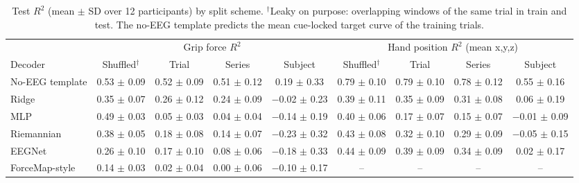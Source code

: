\begin{table}[t]
\centering
\caption{Test $R^2$ (mean $\pm$ SD over 12 participants) by split scheme. $^\dagger$Leaky on purpose: overlapping windows of the same trial in train and test. The no-EEG template predicts the mean cue-locked target curve of the training trials.}
\label{tab:e1}
\footnotesize
\setlength{\tabcolsep}{3pt}
\begin{tabular}{lcccccccc}
\toprule
& \multicolumn{4}{c}{Grip force $R^2$} & \multicolumn{4}{c}{Hand position $R^2$ (mean x,y,z)} \\
\cmidrule(lr){2-5}\cmidrule(lr){6-9}
Decoder & Shuffled$^\dagger$ & Trial & Series & Subject & Shuffled$^\dagger$ & Trial & Series & Subject \\
\midrule
No-EEG template & 0.53 $\pm$ 0.09 & 0.52 $\pm$ 0.09 & 0.51 $\pm$ 0.12 & 0.19 $\pm$ 0.33 & 0.79 $\pm$ 0.10 & 0.79 $\pm$ 0.10 & 0.78 $\pm$ 0.12 & 0.55 $\pm$ 0.16 \\
\midrule
Ridge & 0.35 $\pm$ 0.07 & 0.26 $\pm$ 0.12 & 0.24 $\pm$ 0.09 & $-$0.02 $\pm$ 0.23 & 0.39 $\pm$ 0.11 & 0.35 $\pm$ 0.09 & 0.31 $\pm$ 0.08 & 0.06 $\pm$ 0.19 \\
MLP & 0.49 $\pm$ 0.03 & 0.05 $\pm$ 0.03 & 0.04 $\pm$ 0.04 & $-$0.14 $\pm$ 0.19 & 0.40 $\pm$ 0.06 & 0.17 $\pm$ 0.07 & 0.15 $\pm$ 0.07 & $-$0.01 $\pm$ 0.09 \\
Riemannian & 0.38 $\pm$ 0.05 & 0.18 $\pm$ 0.08 & 0.14 $\pm$ 0.07 & $-$0.23 $\pm$ 0.32 & 0.43 $\pm$ 0.08 & 0.32 $\pm$ 0.10 & 0.29 $\pm$ 0.09 & $-$0.05 $\pm$ 0.15 \\
EEGNet & 0.26 $\pm$ 0.10 & 0.17 $\pm$ 0.10 & 0.08 $\pm$ 0.06 & $-$0.18 $\pm$ 0.33 & 0.44 $\pm$ 0.09 & 0.39 $\pm$ 0.09 & 0.34 $\pm$ 0.09 & 0.02 $\pm$ 0.17 \\
ForceMap-style & 0.14 $\pm$ 0.03 & 0.02 $\pm$ 0.04 & 0.00 $\pm$ 0.06 & $-$0.10 $\pm$ 0.17 & -- & -- & -- & -- \\
\bottomrule
\end{tabular}
\end{table}
